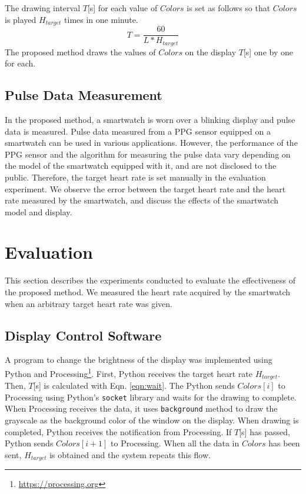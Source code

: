 \documentclass[sigchi,authordraft]{acmart}
\begin{document}
The drawing interval $T$[s] for each value of $Colors$ is set as follows so that $Colors$ is played $H_{target}$ times in one minute.
\begin{equation}
  \label{eqn:wait}
  T = \frac{60}{L * H_{target}}
\end{equation}
The proposed method draws the values of $Colors$ on the display $T$[s] one by one for each.


\subsection{Pulse Data Measurement}
In the proposed method, a smartwatch is worn over a blinking display and pulse data is measured. Pulse data measured from a PPG sensor equipped on a smartwatch can be used in various applications. However, the performance of the PPG sensor and the algorithm for measuring the pulse data vary depending on the model of the smartwatch equipped with it, and are not disclosed to the public. Therefore, the target heart rate is set manually in the evaluation experiment. We observe the error between the target heart rate and the heart rate measured by the smartwatch, and discuss the effects of the smartwatch model and display.

\section{Evaluation}
\label{sec:evaluation}
This section describes the experiments conducted to evaluate the effectiveness of the proposed method. We measured the heart rate acquired by the smartwatch when an arbitrary target heart rate was given.

\subsection{Display Control Software}
\label{subsec:software}
A program to change the brightness of the display was implemented using Python and Processing\footnote{\url{https://processing.org}}. 
First, Python receives the target heart rate $H_{target}$. 
Then, $T$[s] is calculated with Eqn. \ref{eqn:wait}. The Python sends $Colors[i]$ to Processing using Python's \texttt{socket} library and waits for the drawing to complete. When Processing receives the data, it uses \texttt{background} method to draw the grayscale as the background color of the window on the display. When drawing is completed, Python receives the notification from Processing. If $T$[s] has passed, Python sends $Colors[i+1]$ to Processing. When all the data in $Colors$ has been sent, $H_{target}$ is obtained and the system repeats this flow.
\end{document}
